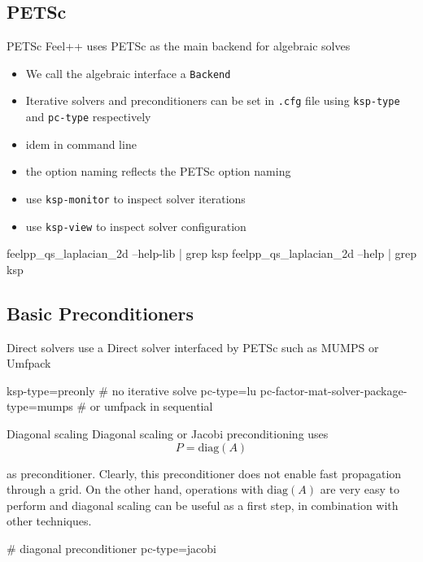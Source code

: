 \subsection{PETSc}

\begin{frame}[fragile]{PETSc}
  Feel++ uses PETSc as the main backend for algebraic solves
  \begin{itemize}
  \item We call the algebraic interface a \texttt{Backend}
  \item Iterative solvers and preconditioners can be set in
    \texttt{.cfg} file using \texttt{ksp-type} and \texttt{pc-type}
    respectively
  \item idem in command line
  \item the option naming reflects the PETSc option naming
  \item use \texttt{ksp-monitor} to inspect solver iterations
  \item use \texttt{ksp-view} to inspect solver configuration
  \end{itemize}
  \begin{bashcode}
    feelpp_qs_laplacian_2d --help-lib | grep ksp
    feelpp_qs_laplacian_2d --help | grep ksp
  \end{bashcode}
\end{frame}

\subsection{Basic Preconditioners}

\begin{frame}[fragile]{Direct solvers}
  use a Direct solver interfaced by PETSc such as MUMPS or Umfpack
  \begin{bashcode}
    ksp-type=preonly # no iterative solve
    pc-type=lu
    pc-factor-mat-solver-package-type=mumps # or umfpack in sequential
  \end{bashcode}
\end{frame}

\begin{frame}[fragile]{Diagonal scaling}
  Diagonal scaling or Jacobi preconditioning uses
  \begin{equation*}
    P = \textrm{diag}(A)
  \end{equation*}

as preconditioner. Clearly, this preconditioner does not enable
fast propagation through a grid. On the other hand, operations
with $\textrm{diag}(A)$ are very easy to perform and diagonal scaling can
be useful as a first step, in combination with other techniques.

\begin{bashcode}
  # diagonal preconditioner
  pc-type=jacobi
\end{bashcode}

\end{frame}

